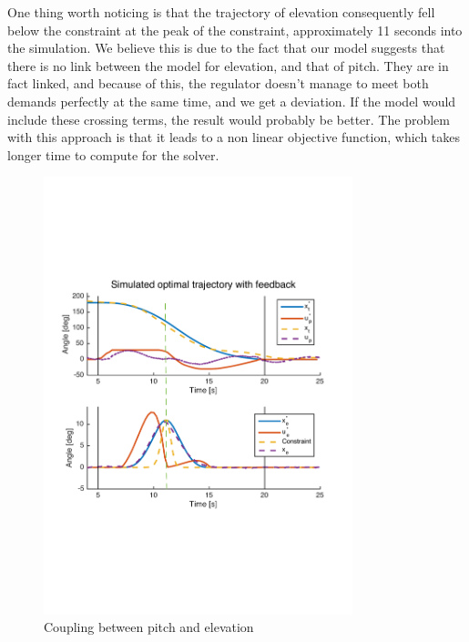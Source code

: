 One thing worth noticing is that the trajectory of elevation consequently fell below the constraint at the peak of the constraint, approximately 11 seconds into the simulation. We believe this is due to the fact that our model suggests that there is no link between the model for elevation, and that of pitch. They are in fact linked, and because of this, the regulator doesn't manage to meet both demands perfectly at the same time, and we get a deviation. If the model would include these crossing terms, the result would probably be better. The problem with this approach is that it leads to a non linear objective function, which takes longer time to compute for the solver.
\begin{figure}[ht!]
    \centering
     \includegraphics[width=0.8\textwidth]{figures/day4_cl/plot_day4_CL_q_20_1_1_1_20_1_marked2}
    \caption{Coupling between pitch and elevation}
    \label{fig:coupling_pitch_elev}
\end{figure}
